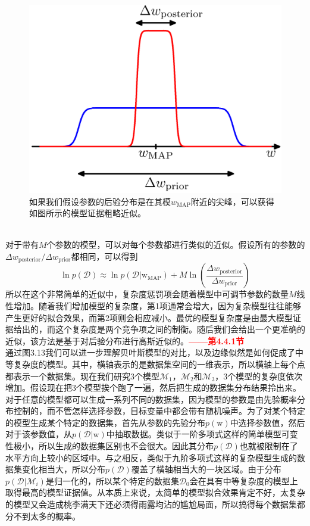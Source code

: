 \documentclass[b5paper]{book}
\numberwithin{equation}{chapter}
\newcommand {\bw} {\boldsymbol{\mathrm{w}}}
\newcommand {\calD} {\mathcal{D}}
\begin{document}
{	\begin{figure}[ht]
		\centering
		\includegraphics[scale=0.8]{Images/3-12.png}
		\caption{如果我们假设参数的后验分布是在其模$w_{\mathrm{MAP}}$附近的尖峰，可以获得如图所示的模型证据粗略近似。}
		\label{fig:3-12}
	\end{figure}
	\\
	\indent 对于带有$M$个参数的模型，可以对每个参数都进行类似的近似。假设所有的参数的$\Delta w_{\mathrm{posterior}} / \Delta w_{\mathrm{prior}}$都相同，可以得到
	\begin{equation}
		\ln p(\calD) \approx \ln p(\calD|\bw_{\mathrm{MAP}})+M\ln \left(\frac{\Delta w_{\mathrm{posterior}}}{\Delta w_{\mathrm{prior}}}\right)
	\end{equation}
	所以在这个非常简单的近似中，复杂度惩罚项会随着模型中可调节参数的数量$M$线性增加。随着我们增加模型的复杂度，第1项通常会增大，因为复杂模型往往能够产生更好的拟合效果，而第2项则会相应减小。最优的模型复杂度是由最大模型证据给出的，而这个复杂度是两个竞争项之间的制衡。随后我们会给出一个更准确的近似，该方法是基于对后验分布进行高斯近似的。\textcolor{red}{\textbf{——第4.4.1节}}\\
	\indent 通过图3.13我们可以进一步理解贝叶斯模型的对比，以及边缘似然是如何促成了中等复杂度的模型。其中，横轴表示的是数据集空间的一维表示，所以横轴上每个点都表示一个数据集。现在我们研究3个模型$\mathcal{M}_1$，$\mathcal{M}_2$和$\mathcal{M}_3$，3个模型的复杂度依次增加。假设现在把3个模型挨个跑了一遍，然后把生成的数据集分布结果拎出来。对于任意的模型都可以生成一系列不同的数据集，因为模型的参数是由先验概率分布控制的，而不管怎样选择参数，目标变量中都会带有随机噪声。为了对某个特定的模型生成某个特定的数据集，首先从参数的先验分布$p(\bw)$中选择参数值，然后对于该参数值，从$p(\calD|\bw)$中抽取数据。类似于一阶多项式这样的简单模型可变性极小，所以生成的数据集区别也不会很大。因此其分布$p(\mathcal{D})$也就被限制在了水平方向上较小的区域中。与之相反，类似于九阶多项式这样的复杂模型生成的数据集变化相当大，所以分布$p(\mathcal{D})$覆盖了横轴相当大的一块区域。由于分布$p(\mathcal{D}|\mathcal{M}_i)$是归一化的，所以某个特定的数据集$\mathcal{D}_0$会在具有中等复杂度的模型上取得最高的模型证据值。从本质上来说，太简单的模型拟合效果肯定不好，太复杂的模型又会造成桃李满天下还必须得雨露均沾的尴尬局面，所以搞得每个数据集都分不到太多的概率。
}
\end{document}
